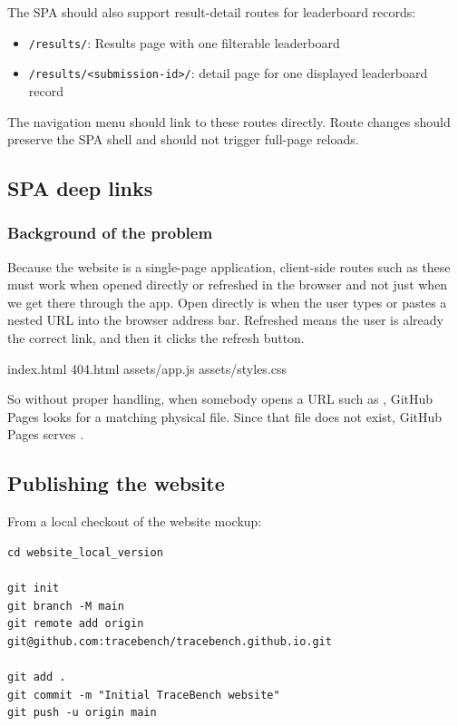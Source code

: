 \documentclass[11pt]{article}
\begin{document}
The SPA should also support result-detail routes for leaderboard records:

\begin{itemize}
    \item \texttt{/results/}: Results page with one filterable leaderboard
    \item \texttt{/results/\textless submission-id\textgreater/}: detail page for one displayed leaderboard record
\end{itemize}

The navigation menu should link to these routes directly.
Route changes should preserve the SPA shell and should not trigger full-page reloads.

\subsection*{SPA deep links}

\subsubsection*{Background of the problem}
Because the website is a single-page application, client-side routes such as these must work when opened directly or refreshed in the browser and not just when we get there through the app. 
Open directly is when the user types or pastes a nested URL into the browser address bar.
Refreshed means the user is already the correct link, and then it clicks the refresh button.
\begin{DocCode}
  index.html
  404.html
  assets/app.js
  assets/styles.css
\end{DocCode}
So without proper handling, when somebody opens a URL such as , GitHub Pages looks for a matching physical file.
Since that file does not exist, GitHub Pages serves .


\subsection*{Publishing the website}

From a local checkout of the website mockup:

\begin{verbatim}
cd website_local_version

git init
git branch -M main
git remote add origin git@github.com:tracebench/tracebench.github.io.git

git add .
git commit -m "Initial TraceBench website"
git push -u origin main
\end{verbatim}
\end{document}
